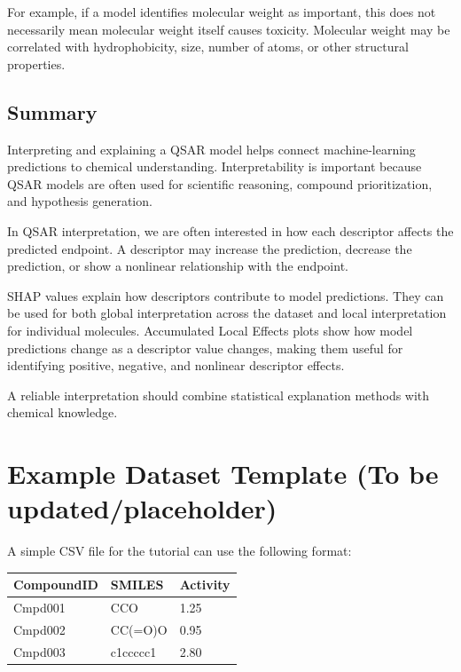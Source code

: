 \documentclass[11pt]{report}
\newenvironment{Important note}{\begin{quote}\color{red}\textbf{Important note:} }{\end{quote}}
\begin{document}
For example, if a model identifies molecular weight as important, this does not necessarily mean molecular weight itself causes toxicity. Molecular weight may be correlated with hydrophobicity, size, number of atoms, or other structural properties.

\section{Summary}

Interpreting and explaining a QSAR model helps connect machine-learning predictions to chemical understanding. Interpretability is important because QSAR models are often used for scientific reasoning, compound prioritization, and hypothesis generation.

In QSAR interpretation, we are often interested in how each descriptor affects the predicted endpoint. A descriptor may increase the prediction, decrease the prediction, or show a nonlinear relationship with the endpoint.

SHAP values explain how descriptors contribute to model predictions. They can be used for both global interpretation across the dataset and local interpretation for individual molecules. Accumulated Local Effects plots show how model predictions change as a descriptor value changes, making them useful for identifying positive, negative, and nonlinear descriptor effects.

A reliable interpretation should combine statistical explanation methods with chemical knowledge.

\appendix

\chapter{Example Dataset Template (To be updated/placeholder)}

A simple CSV file for the tutorial can use the following format:

\begin{center}
\begin{tabular}{lll}
\toprule
\textbf{CompoundID} & \textbf{SMILES} & \textbf{Activity} \\
\midrule
Cmpd001 & CCO & 1.25 \\
Cmpd002 & CC(=O)O & 0.95 \\
Cmpd003 & c1ccccc1 & 2.80 \\
\bottomrule
\end{tabular}
\end{center}
\end{document}
